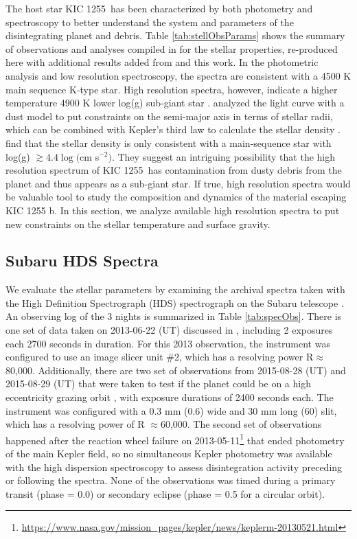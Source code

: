 \documentclass[preprint]{aastex61}
\newcommand{\sha}{KIC 1255 b}
\newcommand{\shStar}{KIC 1255}
\begin{document}
The host star \shStar\ has been characterized by both photometry and spectroscopy to better understand the system and parameters of the disintegrating planet and debris.
Table \ref{tab:stellObsParams} shows the summary of observations and analyses compiled in \citet{vanlieshout2016kic1255} for the stellar properties, re-produced here with additional results added from \citet{morton2016falsePos} and this work.
In the photometric analysis and low resolution spectroscopy, the spectra are consistent with a 4500 K main sequence K-type star.
High resolution spectra, however, indicate a higher temperature 4900 K lower log(g) sub-giant star \citep{kawahara2013starspots}.
\citet{vanlieshout2016kic1255} analyzed the light curve with a dust model to put constraints on the semi-major axis in terms of stellar radii, which can be combined with Kepler's third law to calculate the stellar density \citep{seager2003uniqueSolution}.
\citet{vanlieshout2016kic1255} find that the stellar density is only consistent with a main-sequence star with log(g) $\gtrsim 4.4 \log($cm s$^{-2})$.
They suggest an intriguing possibility that the high resolution spectrum of \shStar\ has contamination from dusty debris from the planet and thus appears as a sub-giant star.
If true, high resolution spectra would be valuable tool to study the composition and dynamics of the material escaping \sha.
In this section, we analyze available high resolution spectra to put new constraints on the stellar temperature and surface gravity.

\subsection{Subaru HDS Spectra}

We evaluate the stellar parameters by examining the archival spectra taken with the High Definition Spectrograph (HDS) spectrograph on the Subaru telescope \citep{noguchi2002hds}.
An observing log of the 3 nights is summarized in Table \ref{tab:specObs}.
There is one set of data taken on 2013-06-22 (UT) discussed in \citet{kawahara2013starspots}, including 2 exposures each 2700 seconds in duration.
For this 2013 observation, the instrument was configured to use an image slicer unit \#2, which has a resolving power R$\approx$80,000.
Additionally, there are two set of observations from 2015-08-28 (UT) and 2015-08-29 (UT) that were taken to test if the planet could be on a high eccentricity grazing orbit \citep{masuda2018rvKIC1255}, with exposure durations of 2400 seconds each.
The instrument was configured with a 0.3 mm (0.6\arcsec) wide and 30 mm long (60\arcsec) slit, which has a resolving power of R $\approx$60,000.
The second set of observations happened after the reaction wheel failure on 2013-05-11\footnote{\url{https://www.nasa.gov/mission_pages/kepler/news/keplerm-20130521.html}} that ended photometry of the main Kepler field, so no simultaneous Kepler photometry was available with the high dispersion spectroscopy to assess disintegration activity preceding or following the spectra.
None of the observations was timed during a primary transit (phase = 0.0) or secondary eclipse (phase = 0.5 for a circular orbit).
\end{document}

